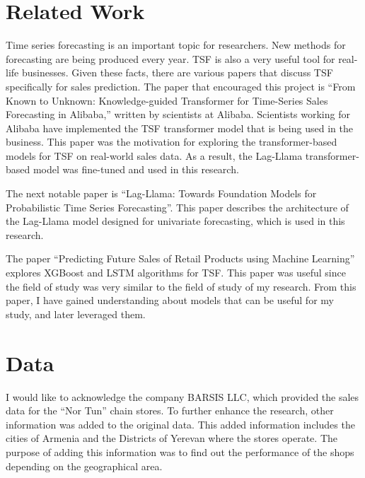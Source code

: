 \documentclass[conference]{IEEEtran}
\begin{document}
\section{Related Work}
Time series forecasting is an important topic for researchers. New methods for forecasting are being produced every year. TSF is also a very useful tool for real-life businesses. Given these facts, there are various papers that discuss TSF specifically for sales prediction. The paper that encouraged this project is ``From Known to Unknown: Knowledge-guided Transformer for Time-Series Sales Forecasting in Alibaba,'' written by scientists at Alibaba.\cite{alibaba_arxiv} Scientists working for Alibaba have implemented the TSF transformer model that is being used in the business. This paper was the motivation for exploring the transformer-based models for TSF on real-world sales data. As a result, the Lag-Llama transformer-based model was fine-tuned and used in this research.\cite{lag_llama_arxiv}

The next notable paper is ``Lag-Llama: Towards Foundation Models for Probabilistic Time Series Forecasting''. This paper describes the architecture of the Lag-Llama model designed for univariate forecasting, which is used in this research.\cite{lag_llama_arxiv}

The paper ``Predicting Future Sales of Retail Products using Machine Learning'' explores XGBoost and LSTM algorithms for TSF.\cite{sales_prediction} This paper was useful since the field of study was very similar to the field of study of my research. From this paper, I have gained understanding about models that can be useful for my study, and later leveraged them.


\section{Data}

I would like to acknowledge the company BARSIS LLC,  which provided the sales data for the “Nor Tun” chain stores. To further enhance the research, other information was added to the original data. This added information includes the cities of Armenia and the Districts of Yerevan where the stores operate. The purpose of adding this information was to find out the performance of the shops depending on the geographical area. 
\end{document}
